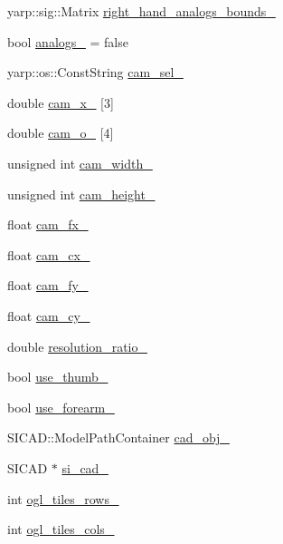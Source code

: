 \begin{DoxyCompactItemize}
\item 
yarp\+::sig\+::\+Matrix \hyperlink{classVisualProprioception_aba826482fa47277e17277ab6b82b8039}{right\+\_\+hand\+\_\+analogs\+\_\+bounds\+\_\+}
\item 
bool \hyperlink{classVisualProprioception_a86284ecba20206e3ecb3125fc90f3ce8}{analogs\+\_\+} = false
\item 
yarp\+::os\+::\+Const\+String \hyperlink{classVisualProprioception_af0e11e8cc5facba0c725fac0b51be679}{cam\+\_\+sel\+\_\+}
\item 
double \hyperlink{classVisualProprioception_ab98ec8641e0cfbed4628e11dd10c9fb8}{cam\+\_\+x\+\_\+} \mbox{[}3\mbox{]}
\item 
double \hyperlink{classVisualProprioception_ae3278b7356ddf3fe357cc74129988521}{cam\+\_\+o\+\_\+} \mbox{[}4\mbox{]}
\item 
unsigned int \hyperlink{classVisualProprioception_aa432bf481b6dd29f2701b095f68b1e19}{cam\+\_\+width\+\_\+}
\item 
unsigned int \hyperlink{classVisualProprioception_a220e87c836c81743f3602da5cc3acebf}{cam\+\_\+height\+\_\+}
\item 
float \hyperlink{classVisualProprioception_a24c5fd2daa8ebf8837ec2746feb98bef}{cam\+\_\+fx\+\_\+}
\item 
float \hyperlink{classVisualProprioception_a8539c7bfe046289d21f82c3617da7896}{cam\+\_\+cx\+\_\+}
\item 
float \hyperlink{classVisualProprioception_a9ca32d1a6bbaf726c980871159b1e21c}{cam\+\_\+fy\+\_\+}
\item 
float \hyperlink{classVisualProprioception_ada8161ede00c312b8b2422deb5aa29e7}{cam\+\_\+cy\+\_\+}
\item 
double \hyperlink{classVisualProprioception_abf67fe6231fc4ecb742ccf9995169e62}{resolution\+\_\+ratio\+\_\+}
\item 
bool \hyperlink{classVisualProprioception_a1c25db32433ee1965a74b3b1af8a4f97}{use\+\_\+thumb\+\_\+}
\item 
bool \hyperlink{classVisualProprioception_a86e0db2eddb88029d98fdc5b4e31dc02}{use\+\_\+forearm\+\_\+}
\item 
S\+I\+C\+A\+D\+::\+Model\+Path\+Container \hyperlink{classVisualProprioception_ae7488d918a9c1893192622cd371d0277}{cad\+\_\+obj\+\_\+}
\item 
S\+I\+C\+AD $\ast$ \hyperlink{classVisualProprioception_aac9aae5f3844b662bd2918273d850120}{si\+\_\+cad\+\_\+}
\item 
int \hyperlink{classVisualProprioception_ac93a3e13b787e20720ff37dfc1e7fbb4}{ogl\+\_\+tiles\+\_\+rows\+\_\+}
\item 
int \hyperlink{classVisualProprioception_a23cd7f7cc9cbbf0e8430c858d7e7bce0}{ogl\+\_\+tiles\+\_\+cols\+\_\+}
\end{DoxyCompactItemize}


